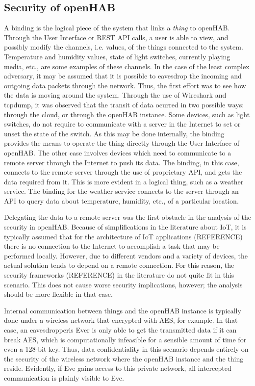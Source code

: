 \documentclass[12pt]{article}
\newcommand{\TODO}{\todo[inline]}
\begin{document}
\subsection{Security of openHAB}
\TODO{is it necessary to add screenshots of tcpdump or wireshark?}
A binding is the logical piece of the system that links a \emph{thing} to openHAB. Through the User Interface or REST API calls, a user is able to view, and possibly modify the channels, i.e. values, of the things connected to the system. Temperature and humidity values, state of light switches, currently playing media, etc., are some examples of these channels. In the case of the least complex adversary, it may be assumed that it is possible to eavesdrop the incoming and outgoing data packets through the network. Thus, the first effort was to see how the data is moving around the system. Through the use of Wireshark and tcpdump, it was observed that the transit of data ocurred in two possible ways: through the cloud, or through the openHAB instance. Some devices, such as light switches, do not require to communicate with a server in the Internet to set or unset the state of the switch. As this may be done internally, the binding provides the means to operate the thing directly through the User Interface of openHAB. The other case involves devices which need to communicate to a remote server through the Internet to push its data. The binding, in this case, connects to the remote server through the use of proprietary API, and gets the data required from it. This is more evident in a logical thing, such as a weather service. The binding for the weather service connects to the server through an API to query data about temperature, humidity, etc., of a particular location.

Delegating the data to a remote server was the first obstacle in the analysis of the security in openHAB. Because of simplifications in the literature about IoT, it is typically assumed that for the architecture of IoT applications (REFERENCE) there is no connection to the Internet to accomplish a task that may be performed locally. However, due to different vendors and a variety of devices, the actual solution tends to depend on a remote connection. For this reason, the security frameworks (REFERENCE) in the literature do not quite fit in this scenario. This does not cause worse security implications, however; the analysis should be more flexible in that case.

Internal communication between things and the openHAB instance is typically done under a wireless network that encrypted with AES, for example. In that case, an eavesdropperis Ever is only able to get the transmitted data if it can break AES, which is computationally infeasible for a sensible amount of time for even a 128-bit key. Thus, data confidentiality in this scenario depends entirely on the security of the wireless network where the openHAB instance and the thing reside. Evidently, if Eve gains access to this private network, all intercepted communication is plainly visible to Eve.
\end{document}
